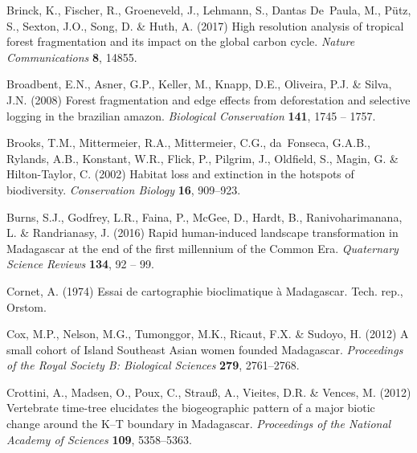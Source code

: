 \documentclass[a4paper, 12pt, leqno]{article}\usepackage[]{graphicx}\usepackage[]{color}
\begin{document}
\begin{thebibliography}{60}
Brinck, K., Fischer, R., Groeneveld, J., Lehmann, S., Dantas De~Paula, M.,
  Pütz, S., Sexton, J.O., Song, D. \& Huth, A. (2017) High resolution analysis
  of tropical forest fragmentation and its impact on the global carbon cycle.
  \emph{Nature Communications} \textbf{8}, 14855.

Broadbent, E.N., Asner, G.P., Keller, M., Knapp, D.E., Oliveira, P.J. \& Silva,
  J.N. (2008) Forest fragmentation and edge effects from deforestation and
  selective logging in the brazilian amazon. \emph{Biological Conservation}
  \textbf{141}, 1745 -- 1757.

Brooks, T.M., Mittermeier, R.A., Mittermeier, C.G., da~Fonseca, G.A.B.,
  Rylands, A.B., Konstant, W.R., Flick, P., Pilgrim, J., Oldfield, S., Magin,
  G. \& Hilton-Taylor, C. (2002) Habitat loss and extinction in the hotspots of
  biodiversity. \emph{Conservation Biology} \textbf{16}, 909--923.

Burns, S.J., Godfrey, L.R., Faina, P., McGee, D., Hardt, B., Ranivoharimanana,
  L. \& Randrianasy, J. (2016) {Rapid human-induced landscape transformation in
  Madagascar at the end of the first millennium of the Common Era}.
  \emph{Quaternary Science Reviews} \textbf{134}, 92 -- 99.

Cornet, A. (1974) {Essai de cartographie bioclimatique à Madagascar}. Tech.
  rep., Orstom.

Cox, M.P., Nelson, M.G., Tumonggor, M.K., Ricaut, F.X. \& Sudoyo, H. (2012) {A
  small cohort of Island Southeast Asian women founded Madagascar}.
  \emph{Proceedings of the Royal Society B: Biological Sciences} \textbf{279},
  2761--2768.

Crottini, A., Madsen, O., Poux, C., Strau{\ss}, A., Vieites, D.R. \& Vences, M.
  (2012) {Vertebrate time-tree elucidates the biogeographic pattern of a major
  biotic change around the K--T boundary in Madagascar}. \emph{Proceedings of
  the National Academy of Sciences} \textbf{109}, 5358--5363.


\end{thebibliography}
\end{document}

